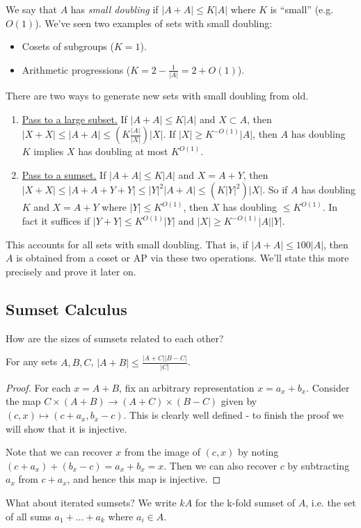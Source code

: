 \documentclass[10pt,a4paper]{article}
\begin{document}
We say that $A$ has \emph{small doubling} if $|A+A| \leq K|A|$ where $K$ is ``small'' (e.g. $O(1)$). We've seen two examples of sets with small doubling:
\begin{itemize}
  \item Cosets of subgroups ($K=1$).
  \item Arithmetic progressions ($K = 2-\frac{1}{|A|} = 2+O(1)$).
\end{itemize}
There are two ways to generate new sets with small doubling from old.
\begin{enumerate}
  \item \underline{Pass to a large subset.} If $|A+A| \leq K|A|$ and $X \subset A$, then $|X+X| \leq |A+A| \leq \left(K\frac{|A|}{|X|}\right)|X|$. If $|X| \geq K^{-O(1)}|A|$, then $A$ has doubling $K$ implies $X$ has doubling at most $K^{O(1)}$.
  \item \underline{Pass to a sumset.} If $|A+A|\leq K|A|$ and $X = A+Y$, then $|X+X| \leq |A+A+Y+Y| \leq |Y|^2|A+A| \leq (K|Y|^2)|X|$. So if $A$ has doubling $K$ and $X = A+Y$ where $|Y| \leq K^{O(1)}$, then $X$ has doubling $\leq K^{O(1)}$. In fact it suffices if $|Y+Y| \leq K^{O(1)}|Y|$ and $|X| \geq K^{-O(1)}|A||Y|$.
\end{enumerate}
This accounts for all sets with small doubling. That is, if $|A+A| \leq 100|A|$, then $A$ is obtained from a coset or AP via these two operations. We'll state this more precisely and prove it later on.
\subsection{Sumset Calculus}
How are the sizes of sumsets related to each other?
\begin{lemma}
  For any sets $A,B,C$, $|A+B| \leq \frac{|A+C||B-C|}{|C|}$.
\end{lemma}
\begin{proof}
  For each $x = A+B$, fix an arbitrary representation $x=a_x+b_x$. Consider the map $C\times(A+B) \to (A+C)\times (B-C)$ given by $(c,x)\mapsto (c+a_x,b_x-c)$. This is clearly well defined - to finish the proof we will show that it is injective.

  Note that we can recover $x$ from the image of $(c,x)$ by noting $(c+a_x) + (b_x-c) = a_x+b_x = x$. Then we can also recover $c$ by subtracting $a_x$ from $c+a_x$, and hence this map is injective.
\end{proof}
What about iterated sumsets? We write $kA$ for the k-fold sumset of $A$, i.e. the set of all sums $a_1+ \ldots + a_k$ where $a_i \in A$.
\end{document}
